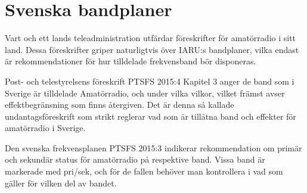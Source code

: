 \chapter{Svenska bandplaner}
\label{svenska bandplaner}

Vart och ett lands teleadministration utfärdar föreskrifter för amatörradio
i sitt land.
Dessa föreskrifter griper naturligtvis över IARU:s bandplaner, vilka endast
är rekommendationer för hur tilldelade frekvensband bör disponeras.

Post- och telestyrelsens föreskrift PTSFS 2015:4 \cite{PTSFS2015:4} Kapitel 3
anger de band som i Sverige är tilldelade Amatörradio, och under vilka
vilkor, vilket främst avser effektbegränsning som finns återgiven.
Det är denna så kallade undantagsföreskrift som strikt reglerar vad som är
tillåtna band och effekter för amatörradio i Sverige.

Den svenska frekvensplanen PTSFS 2015:3 \cite{PTSFS2015:3} indikerar
rekommendation om primär och sekundär status för amatörradio på respektive
band.
Vissa band är markerade med pri/sek, och för de fallen behöver man
kontrollera i \cite{PTSFS2015:3} vad som gäller för vilken del av bandet.

